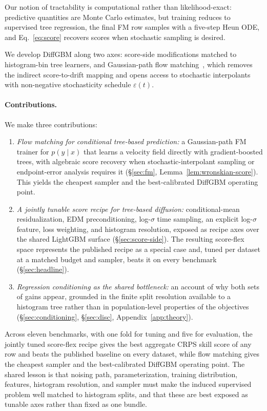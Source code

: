 \documentclass{article}
\begin{document}
Our notion of tractability is computational rather than likelihood-exact: predictive quantities are Monte Carlo estimates, but training reduces to supervised tree regression, the final FM row samples with a five-step Heun ODE, and Eq.~\eqref{eq:score} recovers scores when stochastic sampling is desired.

We develop DiffGBM along two axes: score-side modifications matched to histogram-bin tree learners, and Gaussian-path flow matching~\citep{lipman2023flow,liu2023rectified}, which removes the indirect score-to-drift mapping and opens access to stochastic interpolants~\citep{albergo2023stochastic} with non-negative stochasticity schedule $\varepsilon(t)$.

\paragraph{Contributions.} We make three contributions:
\begin{enumerate}
  \item \emph{Flow matching for conditional tree-based prediction:} a Gaussian-path FM trainer for $p(y \mid x)$ that learns a velocity field directly with gradient-boosted trees, with algebraic score recovery when stochastic-interpolant sampling or endpoint-error analysis requires it (\S\ref{sec:fm}, Lemma~\ref{lem:wronskian-score}). This yields the cheapest sampler and the best-calibrated DiffGBM operating point.
  \item \emph{A jointly tunable score recipe for tree-based diffusion:} conditional-mean residualization, EDM preconditioning, log-$\sigma$ time sampling, an explicit log-$\sigma$ feature, loss weighting, and histogram resolution, exposed as recipe axes over the shared LightGBM surface (\S\ref{sec:score-side}). The resulting score-flex space represents the published recipe as a special case and, tuned per dataset at a matched budget and sampler, beats it on every benchmark (\S\ref{sec:headline}).
  \item \emph{Regression conditioning as the shared bottleneck:} an account of why both sets of gains appear, grounded in the finite split resolution available to a histogram tree rather than in population-level properties of the objectives (\S\ref{sec:conditioning}, \S\ref{sec:disc}, Appendix~\ref{app:theory}).
\end{enumerate}

Across eleven benchmarks, with one fold for tuning and five for evaluation, the jointly tuned score-flex recipe gives the best aggregate CRPS skill score of any row and beats the published baseline on every dataset, while flow matching gives the cheapest sampler and the best-calibrated DiffGBM operating point. The shared lesson is that noising path, parameterization, training distribution, features, histogram resolution, and sampler must make the induced supervised problem well matched to histogram splits, and that these are best exposed as tunable axes rather than fixed as one bundle.
\end{document}
